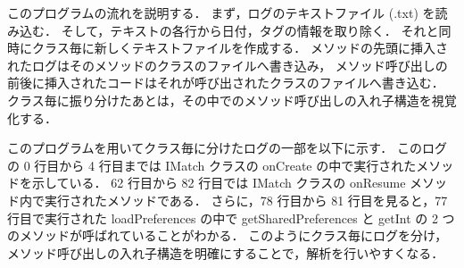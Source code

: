 このプログラムの流れを説明する．
まず，ログのテキストファイル (.txt) を読み込む．
そして，テキストの各行から日付，タグの情報を取り除く．
それと同時にクラス毎に新しくテキストファイルを作成する．
メソッドの先頭に挿入されたログはそのメソッドのクラスのファイルへ書き込み，
メソッド呼び出しの前後に挿入されたコードはそれが呼び出されたクラスのファイルへ書き込む．
クラス毎に振り分けたあとは，その中でのメソッド呼び出しの入れ子構造を視覚化する．


このプログラムを用いてクラス毎に分けたログの一部を以下に示す．
このログの 0 行目から 4 行目までは IMatch クラスの onCreate の中で実行されたメソッドを示している．
62 行目から 82 行目では IMatch クラスの onResume メソッド内で実行されたメソッドである．
さらに，78 行目から 81 行目を見ると，77 行目で実行された loadPreferences の中で getSharedPreferences と getInt の 2 つのメソッドが呼ばれていることがわかる．
このようにクラス毎にログを分け，メソッド呼び出しの入れ子構造を明確にすることで，解析を行いやすくなる．



